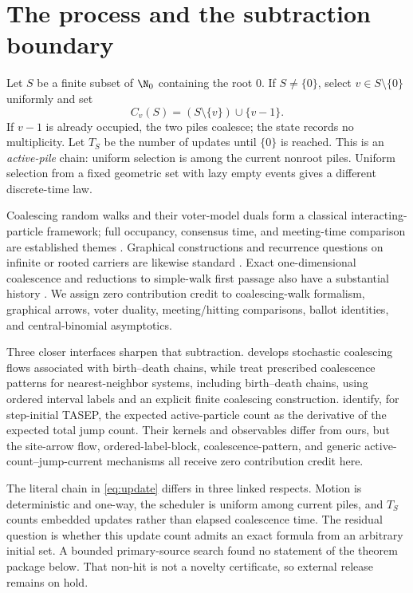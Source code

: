 \section{The process and the subtraction boundary}\label{sec:model}

Let $S$ be a finite subset of $\N_0$ containing the root $0$.  If
$S\ne\{0\}$, select $v\in S\setminus\{0\}$ uniformly and set
\begin{equation}
 C_v(S)=(S\setminus\{v\})\cup\{v-1\}.                 \label{eq:update}
\end{equation}
If $v-1$ is already occupied, the two piles coalesce; the state records no
multiplicity.  Let $T_S$ be the number of updates until $\{0\}$ is reached.
This is an \emph{active-pile} chain: uniform selection is among the current
nonroot piles.  Uniform selection from a fixed geometric set with lazy empty
events gives a different discrete-time law.

Coalescing random walks and their voter-model duals form a classical
interacting-particle framework; full occupancy, consensus time, and
meeting-time comparison are established themes
\cite{Cox1989,Cooper2013,Kanade2023}.  Graphical constructions and recurrence
questions on infinite or rooted carriers are likewise standard
\cite{Benjamini2016}.  Exact one-dimensional coalescence and reductions to
simple-walk first passage also have a substantial history
\cite{Ermakov1997}.  We assign zero contribution credit to coalescing-walk
formalism, graphical arrows, voter duality, meeting/hitting comparisons,
ballot identities, and central-binomial asymptotics.

Three closer interfaces sharpen that subtraction.  \citet{Assiotis2018}
develops stochastic coalescing flows associated with birth--death chains,
while \citet{SniadyUrban2026} treat prescribed coalescence patterns for
nearest-neighbor systems, including birth--death chains, using ordered
interval labels and an explicit finite coalescing construction.
\citet[Theorem~3]{HitczenkoWesolowski2025} identify, for step-initial
TASEP, the expected active-particle count as the derivative of the expected
total jump count.  Their kernels and observables differ from ours, but the
site-arrow flow, ordered-label-block, coalescence-pattern, and generic
active-count--jump-current mechanisms all receive zero contribution credit
here.

The literal chain in \eqref{eq:update} differs in three linked respects.
Motion is deterministic and one-way, the scheduler is uniform among current
piles, and $T_S$ counts embedded updates rather than elapsed coalescence time.
The residual question is whether this update count admits an exact formula
from an arbitrary initial set.  A bounded primary-source search found no
statement of the theorem package below.  That non-hit is not a novelty
certificate, so external release remains on hold.

